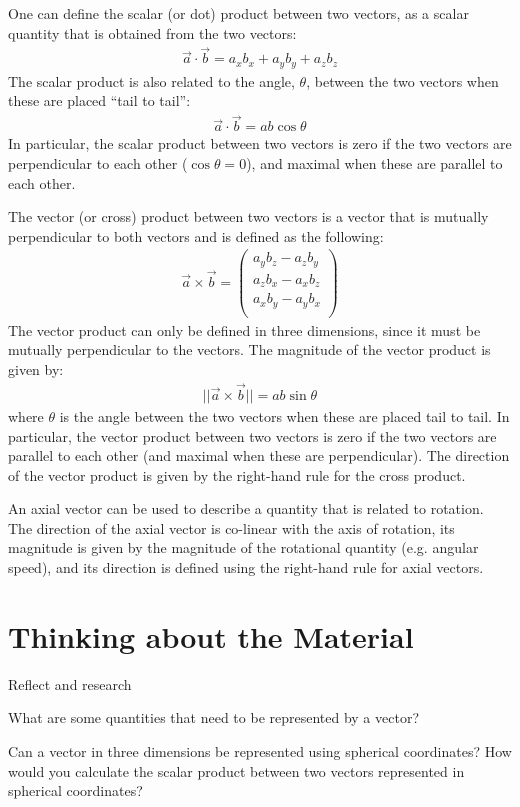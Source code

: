 \begin{chapterSummary}
One can define the scalar (or dot) product between two vectors, as a scalar quantity that is obtained from the two vectors:
\begin{align*}
\vec a \cdot \vec b = a_xb_x + a_yb_y + a_zb_z
\end{align*}
The scalar product is also related to the angle, $\theta$, between the two vectors when these are placed ``tail to tail'':
\begin{align*}
\vec a \cdot \vec b = ab\cos\theta
\end{align*}
In particular, the scalar product between two vectors is zero if the two vectors are perpendicular to each other ($\cos\theta=0$), and maximal when these are parallel to each other.

The vector (or cross) product between two vectors is a vector that is mutually perpendicular to both vectors and is defined as the following:
\begin{align*}
\vec a \times \vec b =\begin{pmatrix}
           a_yb_z - a_z b_y\\
           a_zb_x - a_x b_z\\
           a_xb_y - a_y b_x\\
         \end{pmatrix}
\end{align*}
The vector product can only be defined in three dimensions, since it must be mutually perpendicular to the vectors. The magnitude of the vector product is given by:
\begin{align*}
|| \vec a \times \vec b || = ab\sin\theta
\end{align*}
where $\theta$ is the angle between the two vectors when these are placed tail to tail. In particular, the vector product between two vectors is zero if the two vectors are parallel to each other (and maximal when these are perpendicular). The direction of the vector product is given by the right-hand rule for the cross product.

An axial vector can be used to describe a quantity that is related to rotation. The direction of the axial vector is co-linear with the axis of rotation, its magnitude is given by the magnitude of the rotational quantity (e.g. angular speed), and its direction is defined using the right-hand rule for axial vectors.

\end{chapterSummary}

\section{Thinking about the Material}
\begin{chapteractivity}{Reflect and research}
{
\item What are some quantities that need to be represented by a vector?
\item Can a vector in three dimensions be represented using spherical coordinates? How would you calculate the scalar product between two vectors represented in spherical coordinates?
}
\end{chapteractivity}

